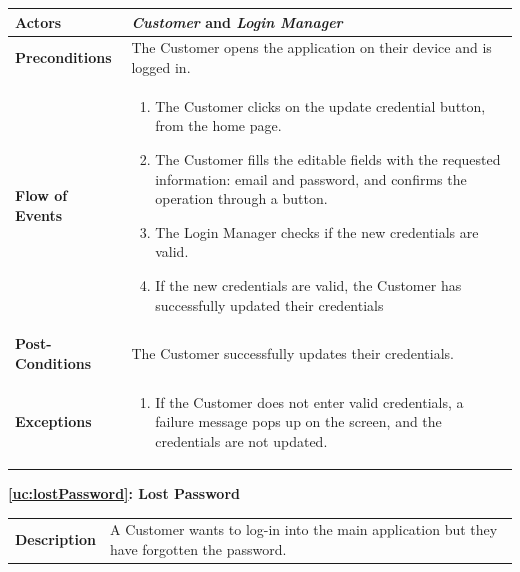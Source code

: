 \documentclass[a4paper, 12pt, oneside]{article}
\begin{document}
\begin{enumerate}[labelindent=20pt, label={UC.\arabic*}, itemindent=1em,leftmargin=!]
\begin{tabularx}{\linewidth}{| l | X |}
	\hline
	\textbf{Actors} & \textbf{\textit{Customer}} and \textit{\textbf{Login Manager}}\\
	
	\hline
	\textbf{Preconditions} & The Customer opens the application on their device and is logged in.\\
	
	\hline
	\textbf{Flow of Events} & \parbox{0.7\textwidth}{	
		\begin{enumerate}
			\item The Customer clicks on the update credential button, from the home page.
			\item The Customer fills the editable fields with the requested information: email and password, and confirms the operation through a button.
			\item The Login Manager checks if the new credentials are valid. 
			\item If the new credentials are valid, the Customer has successfully updated their credentials
	\end{enumerate}}\\
	
	\hline
	\textbf{Post-Conditions} & The Customer successfully updates their credentials.\\
	
	\hline
	\textbf{Exceptions} & \parbox{0.7\textwidth}{ \begin{enumerate}
			\item If the Customer does not enter valid credentials, a failure message pops up on the screen, and the credentials are not updated.
		\end{enumerate}}\\

	\hline
	
\end{tabularx}
\newpage
\begin{center}
{\textbf{\ref{uc:lostPassword}: Lost Password}}
\end{center}
\begin{tabularx}{\linewidth}{| l | X |}
	
	\hline
	\textbf{Description} & A Customer wants to log-in into the main application but they have forgotten the password.\\
	


\end{tabularx}
\end{enumerate}
\end{document}
